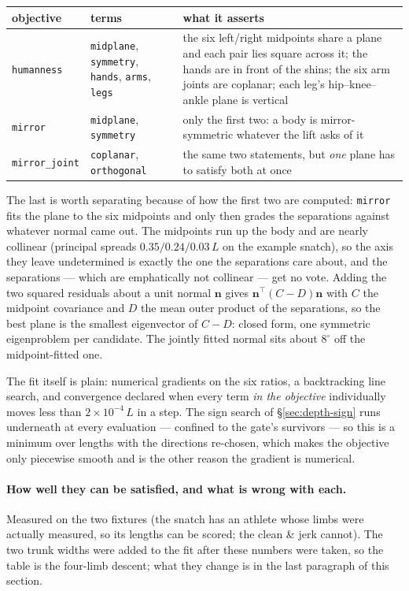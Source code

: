 \documentclass[10pt,a4paper]{article}
\newcommand{\Lt}{L}                      %
\begin{document}
\begin{center}\small
\begin{tabular}{lp{3.9cm}p{6.8cm}}
\hline
objective & terms & what it asserts\\
\hline
\texttt{humanness} & \texttt{midplane}, \texttt{symmetry}, \texttt{hands},
\texttt{arms}, \texttt{legs} & the six left/right midpoints share a plane and
each pair lies square across it; the hands are in front of the shins; the six
arm joints are coplanar; each leg's hip--knee--ankle plane is vertical\\[2pt]
\texttt{mirror} & \texttt{midplane}, \texttt{symmetry} & only the first two:
a body is mirror-symmetric whatever the lift asks of it\\[2pt]
\texttt{mirror\_joint} & \texttt{coplanar}, \texttt{orthogonal} & the same two
statements, but \emph{one} plane has to satisfy both at once\\
\hline
\end{tabular}
\end{center}

\noindent The last is worth separating because of how the first two are
computed: \texttt{mirror} fits the plane to the six midpoints and only then
grades the separations against whatever normal came out. The midpoints run up
the body and are nearly collinear (principal spreads $0.35/0.24/0.03\,\Lt$ on
the example snatch), so the axis they leave undetermined is exactly the one the
separations care about, and the separations --- which are emphatically not
collinear --- get no vote. Adding the two squared residuals about a unit normal
$\mathbf{n}$ gives $\mathbf{n}^\top(C-D)\mathbf{n}$ with $C$ the midpoint
covariance and $D$ the mean outer product of the separations, so the best plane
is the smallest eigenvector of $C-D$: closed form, one symmetric eigenproblem
per candidate. The jointly fitted normal sits about $8^\circ$ off the
midpoint-fitted one.

The fit itself is plain: numerical gradients on the six ratios, a backtracking
line search, and convergence declared when every term \emph{in the objective}
individually moves less than $2\times10^{-4}\,\Lt$ in a step. The sign search of
\S\ref{sec:depth-sign} runs underneath at every evaluation --- confined to the
gate's survivors --- so this is a minimum over lengths with the directions
re-chosen, which makes the objective only piecewise smooth and is the other
reason the gradient is numerical.

\paragraph{How well they can be satisfied, and what is wrong with each.}
Measured on the two fixtures (the snatch has an athlete whose limbs were
actually measured, so its lengths can be scored; the clean \& jerk cannot). The
two trunk widths were added to the fit after these numbers were taken, so the
table is the four-limb descent; what they change is in the last paragraph of
this section.
\end{document}
